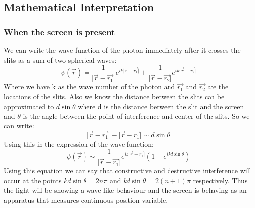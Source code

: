     \subsection{Mathematical Interpretation}
    \subsubsection{When the screen is present}
    We can write the wave function of the photon immediately after it crosses the slits as a sum of two spherical waves:
    \begin{equation}
        \psi(\Vec{r}) = \frac{1}{\lvert \Vec{r} - \Vec{r_1} \rvert}e^{ik\lvert \Vec{r} - \Vec{r_1} \rvert} + \frac{1}{\lvert \Vec{r} - \Vec{r_2} \rvert}e^{ik\lvert \Vec{r} - \Vec{r_2}\rvert}
    \end{equation}
    Where we have k as the wave number of the photon and $\Vec{r_1}$ and $\Vec{r_2}$ are the locations of the slits.
    Also we know the distance between the slits can be approximated to $d \sin \theta$ where d is the distance between the slit and the screen and $\theta$ is the angle between the point of interference and center of the slits. So we can write:
    \begin{equation}
        \lvert \Vec{r} -\Vec{r_1} \rvert - \lvert \Vec{r} -\Vec{r_1} \rvert \sim d\sin \theta
    \end{equation}
    Using this in the expression of the wave function:
    \begin{equation}
        \psi(\Vec{r}) \sim \frac{1}{\lvert \Vec{r} - \Vec{r_1} \rvert}e^{ik\lvert \Vec{r} - \Vec{r_1} \rvert}(1+e^{ikd\sin\theta})
    \end{equation}
    Using this equation we can say that constructive and destructive interference will occur at the points $kd\sin\theta = 2n\pi$ and $kd\sin\theta = 2(n+1)\pi$ respectively. Thus the light will be showing a wave like behaviour and the screen is behaving as an apparatus that measures continuous position variable.
